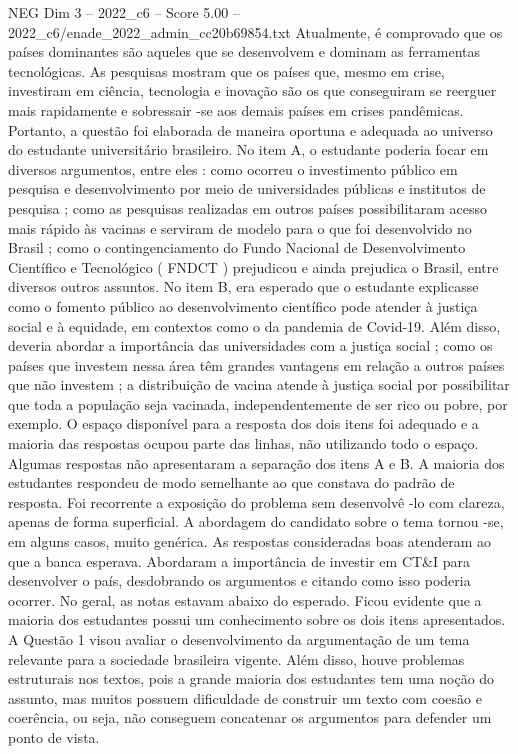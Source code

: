 \begin{textsample}{NEG Dim 3 – 2022\_c6 – Score 5.00 – 2022\_c6/enade\_2022\_admin\_cc20b69854.txt}
Atualmente, é comprovado que os países dominantes são aqueles que se desenvolvem e dominam as ferramentas tecnológicas.
As pesquisas mostram que os países que, mesmo em crise, investiram em ciência, tecnologia e inovação são os que conseguiram se reerguer mais rapidamente e sobressair -se aos demais países em crises pandêmicas.
Portanto, a questão foi elaborada de maneira oportuna e adequada ao universo do estudante universitário brasileiro.
No item A, o estudante poderia focar em diversos argumentos, entre eles : como ocorreu o investimento público em pesquisa e desenvolvimento por meio de universidades públicas e institutos de pesquisa ; como as pesquisas realizadas em outros países possibilitaram acesso mais rápido às vacinas e serviram de modelo para o que foi desenvolvido no Brasil ; como o contingenciamento do Fundo Nacional de Desenvolvimento Científico e Tecnológico ( FNDCT ) prejudicou e ainda prejudica o Brasil, entre diversos outros assuntos.
No item B, era esperado que o estudante explicasse como o fomento público ao desenvolvimento científico pode atender à justiça social e à equidade, em contextos como o da pandemia de Covid-19.
Além disso, deveria abordar a importância das universidades com a justiça social ; como os países que investem nessa área têm grandes vantagens em relação a outros países que não investem ; a distribuição de vacina atende à justiça social por possibilitar que toda a população seja vacinada, independentemente de ser rico ou pobre, por exemplo.
O espaço disponível para a resposta dos dois itens foi adequado e a maioria das respostas ocupou parte das linhas, não utilizando todo o espaço.
Algumas respostas não apresentaram a separação dos itens A e B.
A maioria dos estudantes respondeu de modo semelhante ao que constava do padrão de resposta.
Foi recorrente a exposição do problema sem desenvolvê -lo com clareza, apenas de forma superficial.
A abordagem do candidato sobre o tema tornou -se, em alguns casos, muito genérica.
As respostas consideradas boas atenderam ao que a banca esperava.
Abordaram a importância de investir em CT\&I para desenvolver o país, desdobrando os argumentos e citando como isso poderia ocorrer.
No geral, as notas estavam abaixo do esperado.
Ficou evidente que a maioria dos estudantes possui um conhecimento sobre os dois itens apresentados.
A Questão 1 visou avaliar o desenvolvimento da argumentação de um tema relevante para a sociedade brasileira vigente.
Além disso, houve problemas estruturais nos textos, pois a grande maioria dos estudantes tem uma noção do assunto, mas muitos possuem dificuldade de construir um texto com coesão e coerência, ou seja, não conseguem concatenar os argumentos para defender um ponto de vista.

\end{textsample}
